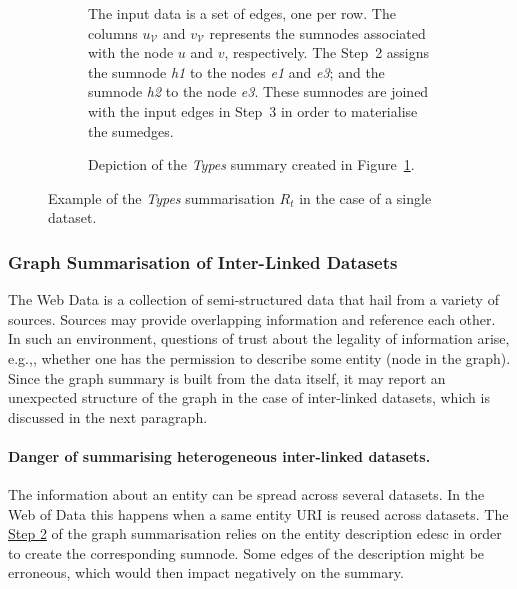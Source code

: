 \begin{figure}
	\centering
	\begin{subfigure}{\textwidth}
		\centering
		\resizebox{\textwidth}{!}{
			
		}
		\caption{The input data is a set of edges, one per row. The columns $u_\mathcal{V}$ and $v_\mathcal{V}$ represents the sumnodes associated with the node $u$ and $v$, respectively. The Step~2 assigns the sumnode \emph{h1} to the nodes \emph{e1} and \emph{e3}; and the sumnode \emph{h2} to the node \emph{e3}. These sumnodes are joined with the input edges in Step~3 in order to materialise the sumedges.}
		\label{tab:algo-ex}
	\end{subfigure}
	\qquad
	\begin{subfigure}{.7\textwidth}
		\centering
		\resizebox{.7\textwidth}{!}{
			
		}
		\caption{Depiction of the \emph{Types} summary created in Figure~\ref{tab:algo-ex}.}
		\label{fig:algo-ex}
	\end{subfigure}
	\caption{Example of the \emph{Types} summarisation $R_t$ in the case of a single dataset.}
\end{figure}

\subsubsection{Graph Summarisation of Inter-Linked Datasets}
\label{chap03:summary:impl:inter-datasets}

The Web Data is a collection of semi-structured data that hail from a variety of sources. Sources may provide overlapping information and reference each other. In such an environment, questions of trust about the legality of information arise, e.g.,, whether one has the permission to describe some entity (node in the graph). Since the graph summary is built from the data itself, it may report an unexpected structure of the graph in the case of inter-linked datasets, which is discussed in the next paragraph.

\paragraph{Danger of summarising heterogeneous inter-linked datasets.}

The information about an entity can be spread across several datasets. In the Web of Data this happens when a same entity URI is reused across datasets. The \hyperref[step-hn]{Step 2} of the graph summarisation relies on the entity description \gls{edesc} in order to create the corresponding sumnode. Some edges of the description might be erroneous, which would then impact negatively on the summary.

